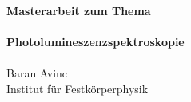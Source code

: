 
\begin{titlepage}
		\pagestyle{fancy}
		\centering\textbf{\large Masterarbeit zum Thema}\\
		\vspace{3cm} 
		\noindent{\color{RoyalPurple}\rule{\textwidth}{1pt}} \\
		\vspace{0.5cm} 
		\centering\textbf{\Huge Photolumineszenzspektroskopie} \\
		\vspace{0.25cm} 
		\noindent{\color{RoyalPurple}\rule{\textwidth}{1pt}} \\
		\vspace{3cm}
		\centering Baran Avinc \\
		\vspace{3cm}
		\centering Institut für Festkörperphysik
		\vspace{\fill} \\
\end{titlepage}


